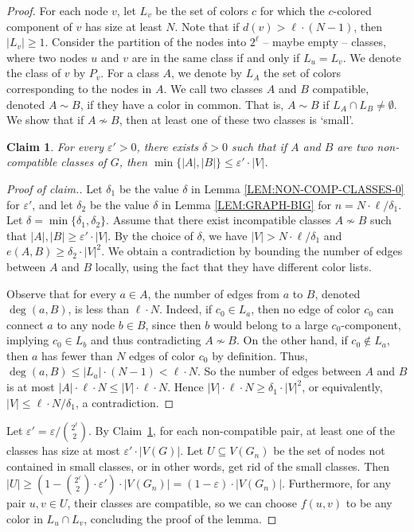 \documentclass[10pt]{article}
\theoremstyle{plain}
\newtheorem{cl}[thm]{Claim}
\theoremstyle{definition}
\newcommand*{\claimproofname}{Proof of claim.}
\newenvironment{claimproof}[1][\claimproofname]{\begin{proof}[#1]\renewcommand*{\qedsymbol}{\(\bullet\)}}{\end{proof}}
\begin{document}
\begin{proof} 
    For each node $v$, let $L_v$ be the set of colors $c$ for which the $c$-colored component of $v$ has size at least $N$. Note that if $d(v)> \ell\cdot (N-1)$, then $|L_v|\geq 1$. Consider the partition of the nodes into $2^\ell$ -- maybe empty -- classes, where two nodes $u$ and $v$ are in the same class if and only if $L_u=L_v$. We denote the class of $v$ by $P_v$. For a class $A$, we denote by $L_A$ the set of colors corresponding to the nodes in $A$.  We call two classes $A$ and $B$ compatible, denoted $A\sim B$, if they have a color in common. That is, $A\sim B$ if $L_A\cap L_B\neq\emptyset$. We show that if $A \not \sim B$, then at least one of these two classes is `small'.
    
    \begin{cl}\label{CL:NON-COMP-CLASSES}
        For every $\varepsilon'>0$, there exists $\delta>0$ such that if $A$ and $B$ are two non-compatible classes of $G$, then $\min\{|A|,|B|\}\leq \varepsilon'\cdot |V|$. 
            \end{cl}
    \begin{claimproof}
            Let $\delta_1$ be the value $\delta$ in Lemma \ref{LEM:NON-COMP-CLASSES-0} for $\varepsilon'$, and let $\delta_2$ be the value $\delta$ in Lemma  \ref{LEM:GRAPH-BIG} for $n=N\cdot \ell/\delta_1$.  Let $\delta=\min\{\delta_1,\delta_2\}$.
            Assume that there exist incompatible classes $A \not\sim B$ such that $|A|,|B|\ge\varepsilon' \cdot|V|$. By the choice of $\delta$, we have $|V|>N\cdot \ell/\delta_1$ and $e(A,B)\ge \delta_2\cdot |V|^2$.
            We obtain a contradiction by bounding the number of edges between $A$ and $B$ locally, using the fact that they have different color lists.
        
            Observe that for every $a\in A$, the number of edges from $a$ to $B$, denoted $\deg(a,B)$, is less than $\ell \cdot N$. Indeed, if $c_0\in L_a$, then no edge of color $c_0$ can connect $a$ to any node $b\in B$, since then $b$ would belong to a large $c_0$-component, implying $c_0\in L_b$ and thus contradicting $A\not\sim B$. On the other hand, if $c_0\notin L_a$, then $a$ has fewer than $N$ edges of color $c_0$ by definition. Thus, $\deg(a,B)\le |L_a|\cdot (N-1)<\ell\cdot  N$. So the number of edges between $A$ and $B$ is at most
            $|A|\cdot\ell\cdot N\le |V|\cdot\ell\cdot N$. Hence $|V|\cdot\ell\cdot N \ge\delta_1\cdot |V|^2$, or equivalently, $|V|\le \ell\cdot N/\delta_1$, a contradiction.
            \end{claimproof}

    Let $\varepsilon'=\varepsilon/\binom{2^\ell}{2}$. By Claim~\ref{CL:NON-COMP-CLASSES}, for each non-compatible pair, at least one of the classes has size at most $\varepsilon'\cdot|V(G)|$. Let $U\subseteq V(G_n)$ be the set of nodes not contained in small classes, or in other words, get rid of the small classes. Then $|U|\geq (1-\binom{2^\ell}{2}\cdot \varepsilon')\cdot|V(G_n)|=(1-\varepsilon)\cdot|V(G_n)|$. Furthermore, for any pair $u,v\in U$, their classes are compatible, so we can choose $f(u,v)$ to be any color in $L_u\cap L_v$, concluding the proof of the lemma.
\end{proof}
\end{document}
